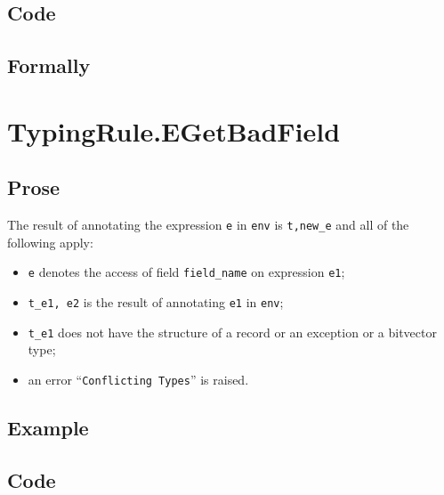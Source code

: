 \documentclass{book}
\begin{document}
  \subsection{Code}

\begin{emptyformal}
    \subsection{Formally}

\end{emptyformal}


\section{TypingRule.EGetBadField \label{sec:TypingRule.EGetBadField}}

 \subsection{Prose}
  The result of annotating the expression \texttt{e} in \texttt{env} is
\texttt{t,new\_e} and all of the following apply:
   \begin{itemize}
   \item \texttt{e} denotes the access of field \texttt{field\_name} on expression \texttt{e1};
   \item \texttt{t\_e1, e2} is the result of annotating \texttt{e1} in \texttt{env};
   \item \texttt{t\_e1} does not have the structure of a record or an exception or a bitvector type;
   \item an error ``\texttt{Conflicting Types}'' is raised.
   \end{itemize}

 \subsection{Example}

 \subsection{Code}
\end{document}

